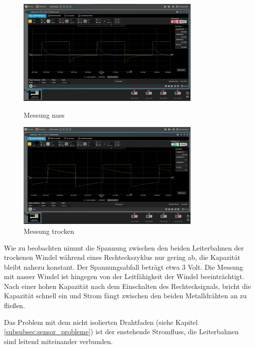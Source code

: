 \begin{figure}[ht]
	\begin{minipage}[ht]{0.45\linewidth}
		\centering
		\includegraphics[width=0.8\textwidth]{includes/kom/graphics/MessungWindelnass_1Ohm_2_2u}
		\caption{Messung nass}
		\label{fig:cap_sensor_wet}
	\end{minipage}
	\begin{minipage}[ht]{0.45\linewidth}
		\centering
		\includegraphics[width=0.8\textwidth]{includes/kom/graphics/MessungWindel_1Ohm_2_2u}
		\caption{Messung trocken}
		\label{fig:cap_sensor_dry}
	\end{minipage}
\end{figure}

Wie zu beobachten nimmt die Spannung zwischen den beiden Leiterbahnen der trockenen Windel während eines Rechteckszyklus nur gering ab, die Kapazität bleibt nahezu konstant. Der Spannungsabfall beträgt etwa 3 Volt. Die Messung mit nasser Windel ist hingegen von der Leitfähigkeit der Windel beeinträchtigt. Nach einer hohen Kapazität nach dem Einschalten des Rechtecksignals, bricht die Kapazität schnell ein und Strom fängt zwischen den beiden Metalldrähten an zu fließen. 

Das Problem mit dem nicht isolierten Drahtfaden (siehe Kapitel \ref{subsubsec:sensor_probleme}) ist der enstehende Stromfluss, die Leiterbahnen sind leitend miteinander verbunden.

